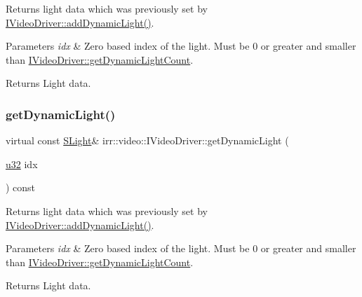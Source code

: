 Returns light data which was previously set by \hyperlink{classirr_1_1video_1_1IVideoDriver_a813a39352eae26c4d30b5882618639be}{I\+Video\+Driver\+::add\+Dynamic\+Light()}. 


\begin{DoxyParams}{Parameters}
{\em idx} & Zero based index of the light. Must be 0 or greater and smaller than \hyperlink{classirr_1_1video_1_1IVideoDriver_a9b1e5de698f264a9f74a17bdba313138}{I\+Video\+Driver\+::get\+Dynamic\+Light\+Count}. \\
\hline
\end{DoxyParams}
\begin{DoxyReturn}{Returns}
Light data. 
\end{DoxyReturn}
\mbox{\label{classirr_1_1video_1_1IVideoDriver_a9eb9ee246e85a56300031f7d7516054e}} 
\subsubsection{\texorpdfstring{get\+Dynamic\+Light()}{getDynamicLight()}\hspace{0.1cm}{\footnotesize\ttfamily [2/2]}}
{\footnotesize\ttfamily virtual const \hyperlink{structirr_1_1video_1_1SLight}{S\+Light}\& irr\+::video\+::\+I\+Video\+Driver\+::get\+Dynamic\+Light (\begin{DoxyParamCaption}\item[{\hyperlink{namespaceirr_a0416a53257075833e7002efd0a18e804}{u32}}]{idx }\end{DoxyParamCaption}) const\hspace{0.3cm}{\ttfamily [pure virtual]}}



Returns light data which was previously set by \hyperlink{classirr_1_1video_1_1IVideoDriver_a813a39352eae26c4d30b5882618639be}{I\+Video\+Driver\+::add\+Dynamic\+Light()}. 


\begin{DoxyParams}{Parameters}
{\em idx} & Zero based index of the light. Must be 0 or greater and smaller than \hyperlink{classirr_1_1video_1_1IVideoDriver_a9b1e5de698f264a9f74a17bdba313138}{I\+Video\+Driver\+::get\+Dynamic\+Light\+Count}. \\
\hline
\end{DoxyParams}
\begin{DoxyReturn}{Returns}
Light data. 
\end{DoxyReturn}
\mbox{\label{classirr_1_1video_1_1IVideoDriver_a9b1e5de698f264a9f74a17bdba313138}} 
